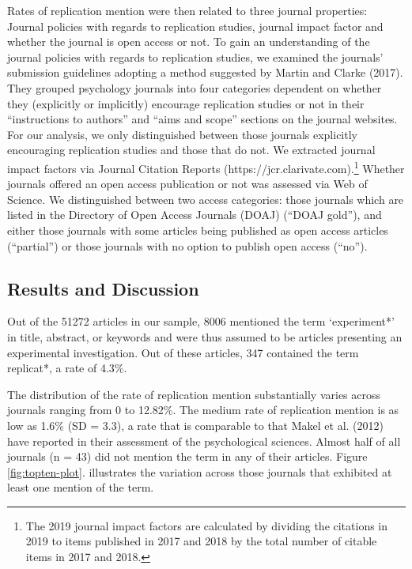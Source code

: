 \documentclass[]{elsarticle} %
\begin{document}
Rates of replication mention were then related to three journal properties: Journal policies with regards to replication studies, journal impact factor and whether the journal is open access or not.
To gain an understanding of the journal policies with regards to replication studies, we examined the journals' submission guidelines adopting a method suggested by Martin and Clarke (2017).
They grouped psychology journals into four categories dependent on whether they (explicitly or implicitly) encourage replication studies or not in their ``instructions to authors'' and ``aims and scope'' sections on the journal websites. For our analysis, we only distinguished between those journals explicitly encouraging replication studies and those that do not.
We extracted journal impact factors via Journal Citation Reports (https://jcr.clarivate.com).\footnote{The 2019 journal impact factors are calculated by dividing the citations in 2019 to items published in 2017 and 2018 by the total number of citable items in 2017 and 2018.}
Whether journals offered an open access publication or not was assessed via Web of Science.
We distinguished between two access categories: those journals which are listed in the Directory of Open Access Journals (DOAJ) (``DOAJ gold''), and either those journals with some articles being published as open access articles (``partial'') or those journals with no option to publish open access (``no'').

\hypertarget{results-and-discussion}{%
\subsection{Results and Discussion}\label{results-and-discussion}}

Out of the 51272 articles in our sample, 8006 mentioned the term `experiment*' in title, abstract, or keywords and were thus assumed to be articles presenting an experimental investigation.
Out of these articles, 347 contained the term replicat*, a rate of 4.3\%.

The distribution of the rate of replication mention substantially varies across journals ranging from 0 to 12.82\%. The medium rate of replication mention is as low as 1.6\% (SD = 3.3), a rate that is comparable to that Makel et al. (2012) have reported in their assessment of the psychological sciences.
Almost half of all journals (n = 43) did not mention the term in any of their articles.
Figure \ref{fig:topten-plot}. illustrates the variation across those journals that exhibited at least one mention of the term.
\end{document}
